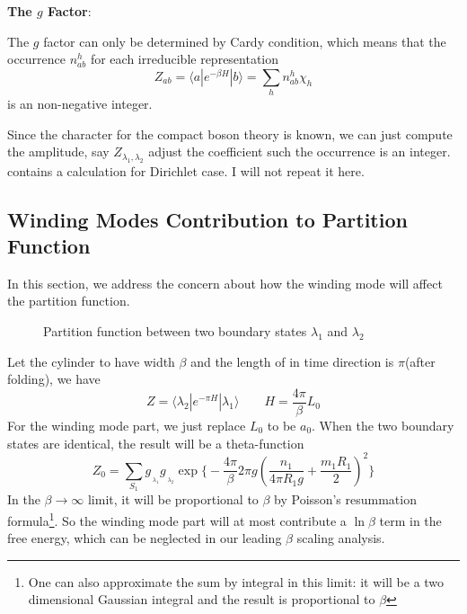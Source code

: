 \documentclass{article}
\begin{document}
{\bf The $g$ Factor}: 

The $g$ factor can only be determined by Cardy condition, which means that the occurrence $n^h_{ab}$ for each irreducible representation
\begin{equation}
Z_{ab} = \langle a | e^{- \beta  H }  | b \rangle  = \sum_{h} n_{ab}^h \chi_h 
\end{equation}
is an non-negative integer. 

Since the character for the compact boson theory is known, we can just compute the amplitude, say $Z_{\lambda_1, \lambda_2}$ adjust the coefficient such the occurrence is an integer. \cite{bachas_fusion_2008} contains a calculation for Dirichlet case. I will not repeat it here. 


\subsection{Winding Modes Contribution to Partition Function}

In this section, we address the concern about how the winding mode will affect the partition function.
\begin{figure}[h]
\centering
{}
\caption{Partition function between two boundary states $\lambda_1$ and $\lambda_2$}
\label{fig:part-lambda1-lambda2}
\end{figure}

Let the cylinder to have width $\beta$ and the length of in time direction is $\pi$(after folding), we have
\begin{equation}
Z = \langle \lambda_2 | e^{-\pi H} | \lambda_1 \rangle   \qquad H = \frac{4\pi}{ \beta} L_0 
\end{equation}
For the winding mode part, we just replace $L_0$ to be $a_0$. When the two boundary states are identical, the result will be a theta-function
\begin{equation}
Z_0 = \sum_{S_1 } g_{\,\!_{\lambda_1} }g_{\,\!_{\lambda_2} } \exp\Big\{- \frac{4\pi}{\beta} 2 \pi g ( \frac{n_1}{ 4 \pi R_1 g} + \frac{m_1 R_1 }{ 2} )^2 \Big\}
\end{equation}
In the $\beta \rightarrow \infty$ limit, it will be proportional to $\beta$ by Poisson's resummation formula\footnote{One can also approximate the sum by integral in this limit: it will be a two dimensional Gaussian integral and the result is proportional to $\beta$}. So the winding mode part will at most contribute a $\ln \beta$ term in the free energy, which can be neglected in our leading $\beta$ scaling analysis. 
\end{document}
